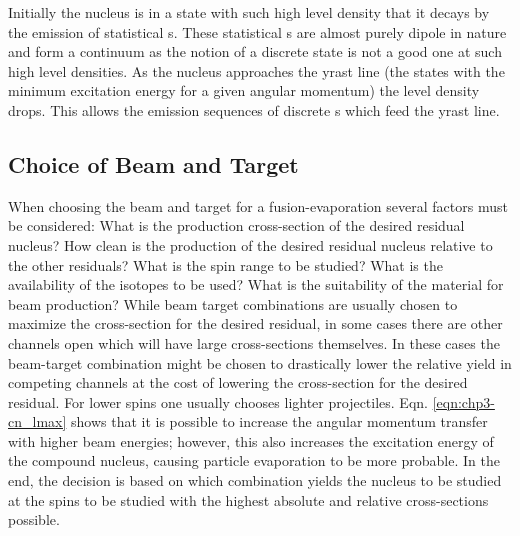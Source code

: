 Initially the nucleus is in a state with such high level density that it decays by the emission of statistical \gr{}s\cite{cnCooling}. These statistical \gr{}s are almost purely dipole in nature and form a continuum as the notion of a discrete state is not a good one at such high level densities. As the nucleus approaches the yrast line (the states with the minimum excitation energy for a given angular momentum) the level density drops. This allows the emission sequences of discrete \gr{}s which feed the yrast line.

\subsection{Choice of Beam and Target}
\label{ssec:exp-pr-fus-evap-beam-target}
When choosing the beam and target for a fusion-evaporation several factors must be considered: What is the production cross-section of the desired residual nucleus? How clean is the production of the desired residual nucleus relative to the other residuals? What is the spin range to be studied? What is the availability of the isotopes to be used? What is the suitability of the material for beam production? While beam target combinations are usually chosen to maximize the cross-section for the desired residual, in some cases there are other channels open which will have large cross-sections themselves. In these cases the beam-target combination might be chosen to drastically lower the relative yield in competing channels at the cost of lowering the cross-section for the desired residual. For lower spins one usually chooses lighter projectiles. Eqn. \ref{eqn:chp3-cn_lmax} shows that it is possible to increase the angular momentum transfer with higher beam energies; however, this also increases the excitation energy of the compound nucleus, causing particle evaporation to be more probable. In the end, the decision is based on which combination yields the nucleus to be studied at the spins to be studied with the highest absolute and relative cross-sections possible.

